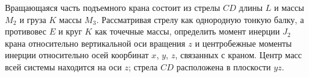  Вращающаяся часть подъемного крана состоит
  из стрелы $CD$
 длины $L$ и массы $M_2$ и груза $K$ массы $M_3$. 
 Рассматривая стрелу как однородную тонкую 
 балку,
 а противовес $E$ и круг $K$ как точечные массы,
 определить момент инерции $J_2$ крана
  относительно
 вертикальной оси вращения $z$ и центробежные
  моменты
 инерции относительно осей коорбинат $x$, $y$, $z$,
 связанных с краном. Центр масс всей системы
  находится
 на оси $z$; стрела $CD$ расположена в плоскости $yz$.
